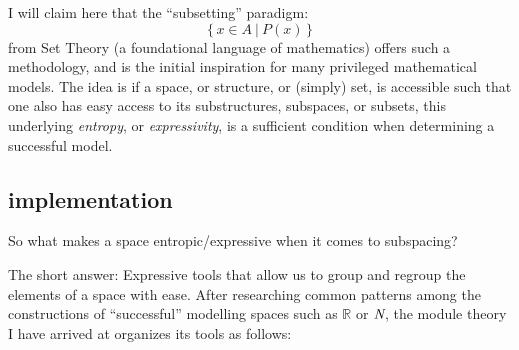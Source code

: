 \documentclass[twoside]{article}
\begin{document}
I will claim here that the ``subsetting'' paradigm:
$$ \{\,x\in A\ |\ P(x)\,\} $$
from Set Theory (a foundational language of mathematics) offers such a methodology, and is the initial inspiration for many
privileged mathematical models. The idea is if a space, or structure, or (simply) set, is accessible such that one also has
easy access to its substructures, subspaces, or subsets, this underlying \emph{entropy}, or \emph{expressivity},
is a sufficient condition when determining a successful model.

\subsection*{implementation}

So what makes a space entropic/expressive when it comes to subspacing?

The short answer: Expressive tools that allow us to group and regroup the elements of a space with ease.
After researching common patterns among the constructions of ``successful'' modelling spaces such as $ \mathbb{R} $
or $ \emph{N} $, the module theory I have arrived at organizes its tools as follows:
\end{document}
